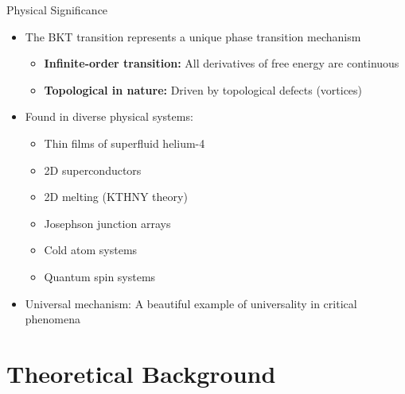\documentclass[11pt,aspectratio=169]{beamer}
\begin{document}
\begin{frame}{Physical Significance}
    \begin{itemize}
        \item The BKT transition represents a unique phase transition mechanism
        \begin{itemize}
            \item \textbf{Infinite-order transition:} All derivatives of free energy are continuous
            \item \textbf{Topological in nature:} Driven by topological defects (vortices)
        \end{itemize}
        \pause
        \item Found in diverse physical systems:
        \begin{itemize}
            \item Thin films of superfluid helium-4
            \item 2D superconductors
            \item 2D melting (KTHNY theory)
            \item Josephson junction arrays
            \item Cold atom systems
            \item Quantum spin systems
        \end{itemize}
        \pause
        \item Universal mechanism: A beautiful example of universality in critical phenomena
    \end{itemize}
\end{frame}

\section{Theoretical Background}
\end{document}
